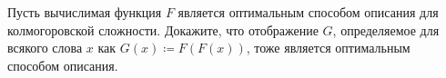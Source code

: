 Пусть вычислимая функция $F$ является оптимальным способом описания для колмогоровской
сложности. Докажите, что отображение $G$, определяемое для всякого слова $x$ как $G(x) \coloneqq
F(F(x))$, тоже является оптимальным способом описания.
